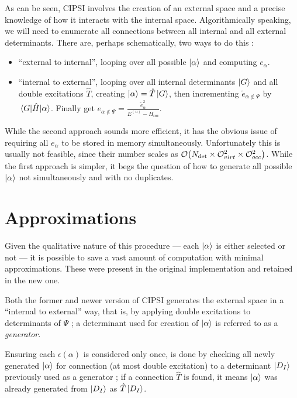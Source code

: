 \documentclass[./thesis.tex]{subfiles}
\begin{document}
As can be seen, CIPSI involves the creation of an external space and a precise knowledge of how it interacts with the internal space. Algorithmically speaking, we will need to enumerate all connections between all internal and all external determinants.
There are, perhaps schematically, two ways to do this :

\begin{itemize}
\item
``external to internal'', looping over all possible ${\ket{\alpha}}$ and computing $e_\alpha$.
\item
``internal to external'', looping over all internal determinants $\ket G$ and all double excitations $\hat T$, creating ${\ket{\alpha}} = \hat T \ket G$, then incrementing $\tilde e_{\alpha \notin \Psi}$ by $\mel{G}{\hat{H}}{\alpha}$. Finally get $e_{\alpha \notin \Psi} = \frac{\tilde e_\alpha^2}{E^{(n)} - H_{\alpha \alpha}}$.
\end{itemize}

While the second approach sounds more efficient, it has the obvious issue of requiring all $e_\alpha$ to be stored in memory simultaneously. Unfortunately this is usually not feasible, since their number scales as $\order{\Ndet \times \mathcal{O}_{virt}^2 \times \mathcal{O}_{occ}^2}$.
While the first approach is simpler, it begs the question of how to generate all possible ${\ket{\alpha}}$ not simultaneously and with no duplicates. 


\section{Approximations}

Given the qualitative nature of this procedure --- each ${\ket{\alpha}}$ is either selected or not --- it is possible to save a vast amount of computation with minimal approximations. These were present in the original implementation and retained in the new one.

Both the former and newer version of CIPSI generates the external space in a ``internal to external'' way, that is, by applying double excitations to determinants of $\Psi$ ; a determinant used for creation of ${\ket{\alpha}}$ is referred to as a \emph{generator}.

Ensuring each $\epsilon(\alpha)$ is considered only once, is done by checking all newly generated ${\ket{\alpha}}$ for connection (at most double excitation) to a determinant $\ket {D_I}$ previously used as a generator ; if a connection $\hat T$ is found, it means ${\ket{\alpha}}$ was already generated from $\ket {D_I}$ as $\hat T \ket {D_I}$.
\end{document}
